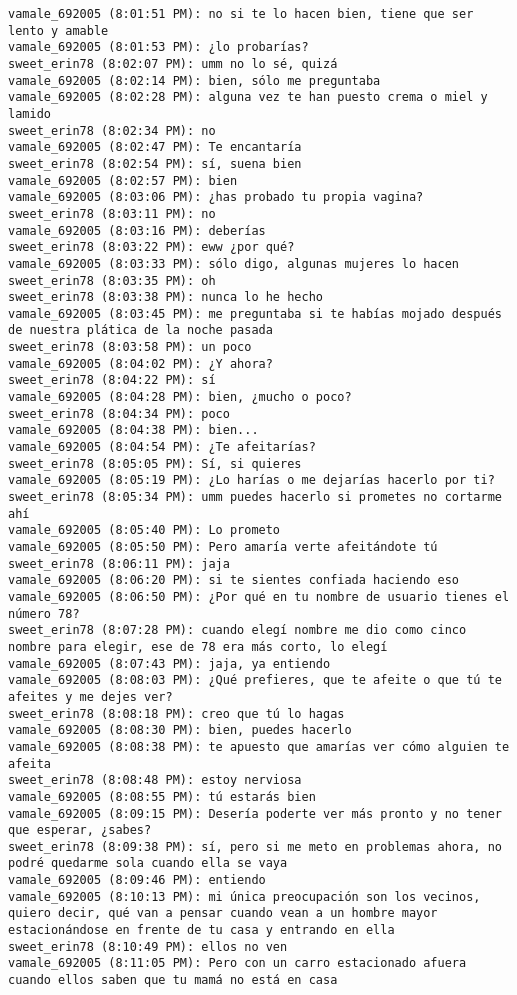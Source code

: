 \begin{verbatim}
vamale_692005 (8:01:51 PM): no si te lo hacen bien, tiene que ser lento y amable
vamale_692005 (8:01:53 PM): ¿lo probarías?
sweet_erin78 (8:02:07 PM): umm no lo sé, quizá
vamale_692005 (8:02:14 PM): bien, sólo me preguntaba
vamale_692005 (8:02:28 PM): alguna vez te han puesto crema o miel y lamido
sweet_erin78 (8:02:34 PM): no
vamale_692005 (8:02:47 PM): Te encantaría
sweet_erin78 (8:02:54 PM): sí, suena bien
vamale_692005 (8:02:57 PM): bien
vamale_692005 (8:03:06 PM): ¿has probado tu propia vagina?
sweet_erin78 (8:03:11 PM): no
vamale_692005 (8:03:16 PM): deberías
sweet_erin78 (8:03:22 PM): eww ¿por qué?
vamale_692005 (8:03:33 PM): sólo digo, algunas mujeres lo hacen
sweet_erin78 (8:03:35 PM): oh
sweet_erin78 (8:03:38 PM): nunca lo he hecho
vamale_692005 (8:03:45 PM): me preguntaba si te habías mojado después de nuestra plática de la noche pasada
sweet_erin78 (8:03:58 PM): un poco
vamale_692005 (8:04:02 PM): ¿Y ahora?
sweet_erin78 (8:04:22 PM): sí
vamale_692005 (8:04:28 PM): bien, ¿mucho o poco?
sweet_erin78 (8:04:34 PM): poco
vamale_692005 (8:04:38 PM): bien...
vamale_692005 (8:04:54 PM): ¿Te afeitarías?
sweet_erin78 (8:05:05 PM): Sí, si quieres
vamale_692005 (8:05:19 PM): ¿Lo harías o me dejarías hacerlo por ti?
sweet_erin78 (8:05:34 PM): umm puedes hacerlo si prometes no cortarme ahí
vamale_692005 (8:05:40 PM): Lo prometo
vamale_692005 (8:05:50 PM): Pero amaría verte afeitándote tú
sweet_erin78 (8:06:11 PM): jaja
vamale_692005 (8:06:20 PM): si te sientes confiada haciendo eso
vamale_692005 (8:06:50 PM): ¿Por qué en tu nombre de usuario tienes el número 78?
sweet_erin78 (8:07:28 PM): cuando elegí nombre me dio como cinco nombre para elegir, ese de 78 era más corto, lo elegí
vamale_692005 (8:07:43 PM): jaja, ya entiendo
vamale_692005 (8:08:03 PM): ¿Qué prefieres, que te afeite o que tú te afeites y me dejes ver?
sweet_erin78 (8:08:18 PM): creo que tú lo hagas
vamale_692005 (8:08:30 PM): bien, puedes hacerlo
vamale_692005 (8:08:38 PM): te apuesto que amarías ver cómo alguien te afeita
sweet_erin78 (8:08:48 PM): estoy nerviosa
vamale_692005 (8:08:55 PM): tú estarás bien
vamale_692005 (8:09:15 PM): Desería poderte ver más pronto y no tener que esperar, ¿sabes?
sweet_erin78 (8:09:38 PM): sí, pero si me meto en problemas ahora, no podré quedarme sola cuando ella se vaya
vamale_692005 (8:09:46 PM): entiendo
vamale_692005 (8:10:13 PM): mi única preocupación son los vecinos, quiero decir, qué van a pensar cuando vean a un hombre mayor estacionándose en frente de tu casa y entrando en ella
sweet_erin78 (8:10:49 PM): ellos no ven
vamale_692005 (8:11:05 PM): Pero con un carro estacionado afuera cuando ellos saben que tu mamá no está en casa

\end{verbatim}
